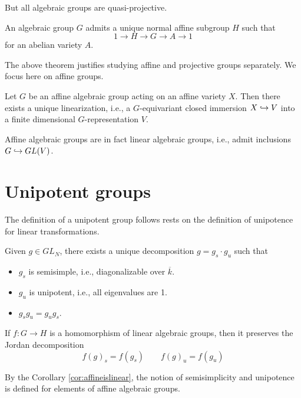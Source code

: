 \begin{rem}
But all algebraic groups are quasi-projective.
\end{rem}

\begin{thm}[Chevalley]
An algebraic group $G$ admits a unique normal affine subgroup $H$ such that
\[
1 \to H \to G \to A \to 1
\]
for an abelian variety $A$.
\end{thm}
\noindent The above theorem justifies studying affine and projective groups separately. We focus here on affine groups.

\begin{prop}
Let $G$ be an affine algebraic group acting on an affine variety $X$. Then there exists a unique linearization, i.e., a $G$-equivariant closed immersion $X \hookrightarrow V$ into a finite dimensional $G$-representation $V$.
\end{prop}

\begin{cor}\label{cor:affineislinear}
Affine algebraic groups are in fact linear algebraic groups, i.e., admit inclusions $G \hookrightarrow GL(V)$.
\end{cor}

\section{Unipotent groups}

The definition of a unipotent group follows rests on the definition of unipotence for linear transformations.

\begin{defn}
Given $g \in GL_N$, there exists a unique decomposition $g = g_s \cdot g_u$ such that 
\begin{itemize}
\item $g_s$ is semisimple, i.e., diagonalizable over $\overline{k}$.
\item $g_u$ is unipotent, i.e., all eigenvalues are 1.
\item $g_s g_u = g_u g_s$.
\end{itemize}
\end{defn}

\begin{prop}
If $f : G \to H$ is a homomorphism of linear algebraic groups, then it preserves the Jordan decomposition
\[
f(g)_s = f(g_s) \qquad f(g)_u = f(g_u)
\]
\end{prop}

\noindent By the Corollary \ref{cor:affineislinear}, the notion of semisimplicity and unipotence is defined for elements of affine algebraic groups.

